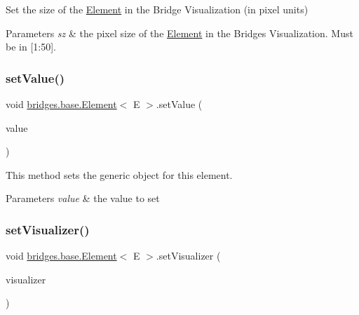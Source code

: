 Set the size of the \hyperlink{classbridges_1_1base_1_1_element}{Element} in the Bridge Visualization (in pixel units)


\begin{DoxyParams}{Parameters}
{\em sz} & the pixel size of the \hyperlink{classbridges_1_1base_1_1_element}{Element} in the Bridges Visualization. Must be in \mbox{[}1\+:50\mbox{]}. \\
\hline
\end{DoxyParams}
\mbox{\label{classbridges_1_1base_1_1_element_ab3cf1241da0bc4c59cea9d6f0fd7aaf4}} 
\subsubsection{\texorpdfstring{set\+Value()}{setValue()}}
{\footnotesize\ttfamily void \hyperlink{classbridges_1_1base_1_1_element}{bridges.\+base.\+Element}$<$ E $>$.set\+Value (\begin{DoxyParamCaption}\item[{E}]{value }\end{DoxyParamCaption})}

This method sets the generic object for this element.


\begin{DoxyParams}{Parameters}
{\em value} & the value to set \\
\hline
\end{DoxyParams}
\mbox{\label{classbridges_1_1base_1_1_element_a5befa95788099f1bc72cdf5361c55bed}} 
\subsubsection{\texorpdfstring{set\+Visualizer()}{setVisualizer()}}
{\footnotesize\ttfamily void \hyperlink{classbridges_1_1base_1_1_element}{bridges.\+base.\+Element}$<$ E $>$.set\+Visualizer (\begin{DoxyParamCaption}\item[{\hyperlink{classbridges_1_1base_1_1_element_visualizer}{Element\+Visualizer}}]{visualizer }\end{DoxyParamCaption})}

